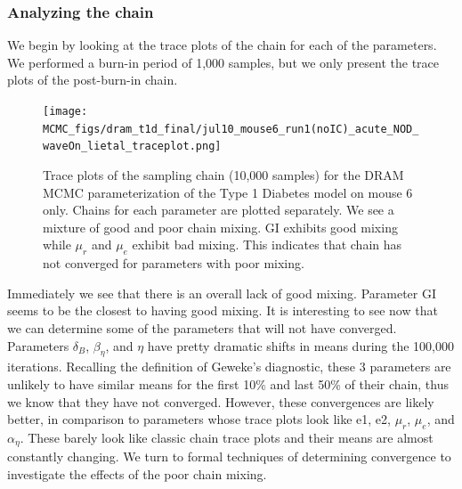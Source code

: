 \documentclass{article}
\begin{document}
\subsubsection{Analyzing the chain}
We begin by looking at the trace plots of the chain for each of the parameters. We performed a burn-in period of 1,000 samples, but we only present the trace plots of the post-burn-in chain.
\begin{figure}[H]
    \centering
    \texttt{[image: MCMC\_figs/dram\_t1d\_final/jul10\_mouse6\_run1(noIC)\_acute\_NOD\_waveOn\_lietal\_traceplot.png]}
    \caption{Trace plots of the sampling chain (10,000 samples) for the DRAM MCMC parameterization of the Type 1 Diabetes model on mouse 6 only. Chains for each parameter are plotted separately. We see a mixture of good and poor chain mixing. GI exhibits good mixing while $\mu_r$ and $\mu_e$ exhibit bad mixing. This indicates that chain has not converged for parameters with poor mixing.}
    \label{fig:18mcmc}
\end{figure}
Immediately we see that there is an overall lack of good mixing. Parameter GI seems to be the closest to having good mixing. It is interesting to see now that we can determine some of the parameters that will not have converged. Parameters $\delta_B$, $\beta_{\eta}$, and $\eta$ have pretty dramatic shifts in means during the 100,000 iterations. Recalling the definition of Geweke's diagnostic, these 3 parameters are unlikely to have similar means for the first 10\% and last 50\% of their chain, thus we know that they have not converged. However, these convergences are likely better, in comparison to parameters whose trace plots look like e1, e2, $\mu_r$, $\mu_e$, and $\alpha_{\eta}$. These barely look like classic chain trace plots and their means are almost constantly changing. We turn to formal techniques of determining convergence to investigate the effects of the poor chain mixing.
\end{document}
